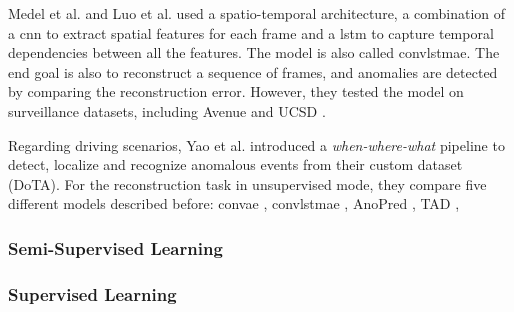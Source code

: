 Medel et al. \cite{medel_lstmconvae} and Luo et al. \cite{luo_lstmconvae}
 used a spatio-temporal architecture, a 
combination of a \ac{cnn} to extract spatial features for each frame and a 
\ac{lstm} to capture temporal dependencies between all the features. 
The model is also called \ac{convlstmae}.
The end 
goal is also to reconstruct a sequence of frames, and anomalies are detected 
by comparing the reconstruction error. However, they tested the model on 
surveillance datasets, including Avenue \cite{a3d} and UCSD \cite{ucsd}.

Regarding driving scenarios, Yao et al. \cite{dota_dataset} introduced a 
\emph{when-where-what} pipeline to detect, localize and recognize anomalous 
events from their custom dataset (DoTA). For the reconstruction task in 
unsupervised mode, they compare five different models described before: 
\ac{convae} \cite{hasan_convae}, \ac{convlstmae} \cite{luo_lstmconvae}, 
AnoPred \cite{shanghaitech_dataset}, TAD \cite{a3d}, 

\subsubsection{Semi-Supervised Learning}

\subsubsection{Supervised Learning}